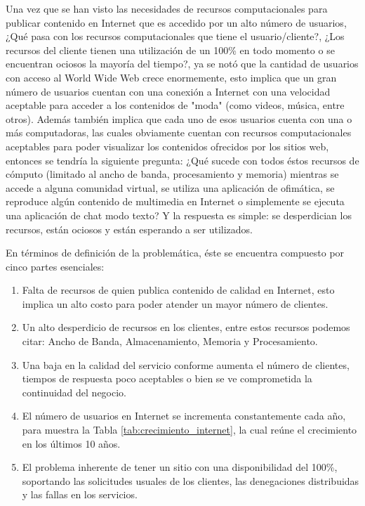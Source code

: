 Una vez que se han visto las necesidades de recursos computacionales para publicar contenido en Internet que es accedido por un alto número de usuarios, ¿Qué pasa con los recursos computacionales que tiene el usuario/cliente?, ¿Los recursos del cliente tienen una utilización de un 100\% en todo momento o se encuentran ociosos la mayoría del tiempo?, ya se notó que la cantidad de usuarios con acceso al World Wide Web crece enormemente, esto implica que un gran número de usuarios cuentan con una conexión a Internet con una velocidad aceptable para acceder a los contenidos de "moda" (como videos, música, entre otros). Además también implica que cada uno de esos usuarios cuenta con una o más computadoras, las cuales obviamente cuentan con recursos computacionales aceptables para poder visualizar los contenidos ofrecidos por los sitios web, entonces se tendría la siguiente pregunta: ¿Qué sucede con todos éstos recursos de cómputo (limitado al ancho de banda, procesamiento y memoria) mientras se accede a alguna comunidad virtual, se utiliza una aplicación de ofimática, se reproduce algún contenido de multimedia en Internet o simplemente se ejecuta una aplicación de chat modo texto?  Y la respuesta es simple: se desperdician los recursos, están ociosos y están esperando a ser utilizados.

En términos de definición de la problemática, éste se encuentra compuesto por cinco partes esenciales:
\begin{enumerate}
\item Falta de recursos de quien publica contenido de calidad en Internet, esto implica un alto costo para poder atender un mayor número de clientes.
\item Un alto desperdicio de recursos en los clientes, entre estos recursos podemos citar: Ancho de Banda, Almacenamiento, Memoria y Procesamiento.
\item Una baja en la calidad del servicio conforme aumenta el número de clientes, tiempos de respuesta poco aceptables o bien se ve comprometida la continuidad del negocio. 
\item El número de usuarios en Internet se incrementa constantemente cada año, para muestra la Tabla \ref{tab:crecimiento_internet}, la cual reúne el crecimiento en los últimos 10 años.
\item El problema inherente de tener un sitio con una disponibilidad del 100\%, soportando las solicitudes usuales de los clientes, las denegaciones distribuidas y las fallas en los servicios. 
\end{enumerate}


